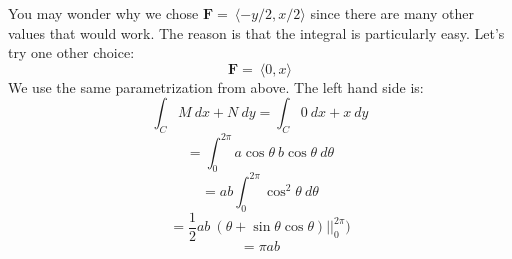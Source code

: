 \documentclass[11pt, oneside]{article}
\begin{document}
You may wonder why we chose $\mathbf{F} = \ \langle -y/2, x/2 \rangle$ since there are many other values that would work.  The reason is that the integral is particularly easy.  Let's try one other choice:
\[ \mathbf{F} = \ \langle 0, x \rangle \]
We use the same parametrization from above.  The left hand side is:
\[ \int_C M \ dx + N \ dy = \int_C 0 \ dx + x \ dy \]
\[ =  \int_0^{2\pi} a \cos \theta \ b \cos \theta \ d \theta \]
\[ = ab \int_0^{2\pi}  \cos^2 \theta \ d \theta \]
\[ = \frac{1}{2} a b \ (\theta + \sin \theta \cos \theta) | \bigg |_0^{2\pi}  ) \]
\[ = \pi a b \]
\end{document}

